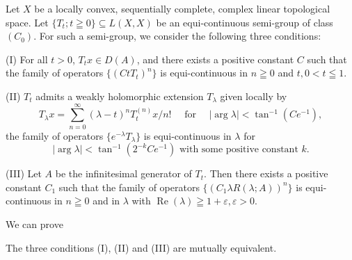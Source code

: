 Let $X$ be a locally convex, sequentially complete, complex linear topological space. Let $\{T_{t}; t \geqq 0\} \subseteq L(X, X)$ be an equi-continuous semi-group of class $(C_{0})$. For such a semi-group, we consider the following three conditions: 

(I) For all $t > 0$, $T_{t}x \in D(A)$, and there exists a positive constant $C$ such that the family of operators $\{(CtT_t)^n\}$ is equi-continuous in $n \geqq 0$ and $t, 0 < t \leqq 1$. 

(II) $T_{t}$ admits a weakly holomorphic extension $T_{\lambda}$ given locally by 
\begin{equation}\label{eq:IX.10.2}
T _{\lambda} x = \sum\limits_{n=0} ^{\infty} (\lambda - t) ^{n} T _{t} ^{(n)} x / n! \quad \text{ for } \quad | \arg \lambda | < \tan^{-1} (C e ^{-1}),
\end{equation}
the family of operators $\{e^{-\lambda}T_{\lambda}\}$ is equi-continuous in $\lambda$ for 
\begin{equation}\label{eq:IX.10.3}
\left| \arg \lambda \right| < \tan^{-1} \left(2 ^{-k} C e ^{-1}\right) \text{ with some positive constant } k.
\end{equation}

(III) Let $A$ be the infinitesimal generator of $T_{t}$. Then there exists a positive constant $C_{1}$ such that the family of operators $\{(C_{1}\lambda R(\lambda ;A))^{n}\}$ is equi-continuous in $n\geqq 0$ and in $\lambda$ with $\operatorname{Re}(\lambda)\geqq 1 + \varepsilon ,\varepsilon >0$. 

We can prove 

\begin{theoremu} The three conditions (I), (II) and (III) are mutually equivalent. 
\end{theoremu}

